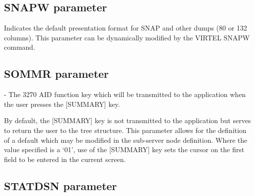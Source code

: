 \documentclass[letterpaper,10pt,english]{sphinxmanual}
\begin{document}
\ignorespaces 

\subsection{SNAPW parameter}
\label{\detokenize{Installation_Guide:snapw-parameter}}\label{\detokenize{Installation_Guide:index-115}}
\begin{sphinxVerbatim}[commandchars=\\\{\}]
 
\end{sphinxVerbatim}

Indicates the default presentation format for SNAP and other dumps (80 or 132 columns). This parameter can be dynamically modified by the VIRTEL SNAPW command.


\subsection{SOMMR parameter}
\label{\detokenize{Installation_Guide:sommr-parameter}}
\begin{sphinxVerbatim}[commandchars=\\\{\}]
 
\end{sphinxVerbatim}

 - The 3270 AID function key which will be transmitted to the application when the user presses the {[}SUMMARY{]} key.

By default, the {[}SUMMARY{]} key is not transmitted to the application but serves to return the user to the tree structure. This parameter allows for the definition of a default which may be modified in the sub-server node definition. Where the value specified is a ‘01’, use of the {[}SUMMARY{]} key sets the cursor on the first field to be entered in the current screen.

\ignorespaces 

\subsection{STATDSN parameter}
\label{\detokenize{Installation_Guide:statdsn-parameter}}\label{\detokenize{Installation_Guide:index-116}}
\begin{sphinxVerbatim}[commandchars=\\\{\}]
 
\end{sphinxVerbatim}
\end{document}

